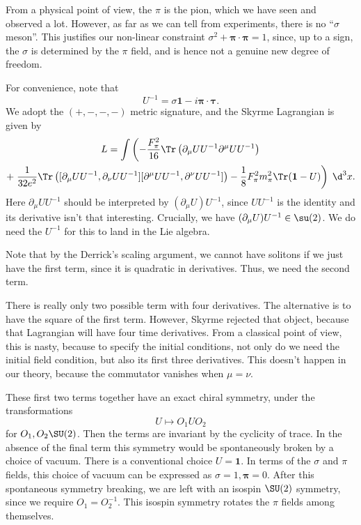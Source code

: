 \documentclass[a4paper]{article}
\begin{document}
From a physical point of view, the $\pi$ is the pion, which we have seen and observed a lot. However, as far as we can tell from experiments, there is no ``$\sigma$ meson''. This justifies our non-linear constraint $\sigma^2 + \boldsymbol\pi \cdot \boldsymbol\pi = 1$, since, up to a sign, the $\sigma$ is determined by the $\pi$ field, and is hence not a genuine new degree of freedom.

For convenience, note that
\[
  U^{-1} = \sigma \mathbf{1} - i \boldsymbol\pi \cdot \boldsymbol\tau.
\]
We adopt the $(+, -, -, -)$ metric signature, and the Skyrme Lagrangian is given by
\begin{multline*}
  L = \int \left( -\frac{F_{\pi}^2 }{16} \Tr \left( \partial_\mu UU^{-1} \partial^\mu UU^{-1}\right)\right. \\
  + \left.\frac{1}{32e^2}\Tr\left([\partial_\mu UU^{-1}, \partial_\nu UU^{-1}][\partial^\mu UU^{-1}, \partial^\nu UU^{-1}]\right) - \frac{1}{8} F_\pi^2 m_\pi^2 \Tr(\mathbf{1} - U)\right)\;\d^3 x.
\end{multline*}
Here $\partial_\mu UU^{-1}$ should be interpreted by $(\partial_\mu U)U^{-1}$, since $UU^{-1}$ is the identity and its derivative isn't that interesting. Crucially, we have $(\partial_\mu U)U^{-1} \in \su(2)$. We do need the $U^{-1}$ for this to land in the Lie algebra. %

Note that by the Derrick's scaling argument, we cannot have solitons if we just have the first term, since it is quadratic in derivatives. Thus, we need the second term.

There is really only two possible term with four derivatives. The alternative is to have the square of the first term. However, Skyrme rejected that object, because that Lagrangian will have four time derivatives. From a classical point of view, this is nasty, because to specify the initial conditions, not only do we need the initial field condition, but also its first three derivatives. This doesn't happen in our theory, because the commutator vanishes when $\mu = \nu$.

These first two terms together have an exact chiral symmetry, under the transformations
\[
  U \mapsto O_1 U O_2
\]
for $O_1, O_2 \SU(2)$. Then the terms are invariant by the cyclicity of trace. In the absence of the final term this symmetry would be spontaneously broken by a choice of vacuum. There is a conventional choice $U = \mathbf{1}$. In terms of the $\sigma$ and $\pi$ fields, this choice of vacuum can be expressed as $\sigma = 1, \boldsymbol\pi = 0$. After this spontaneous symmetry breaking, we are left with an isospin $\SU(2)$ symmetry, since we require $O_1 = O_2^{-1}$. This isospin symmetry rotates the $\pi$ fields among themselves.
\end{document}
